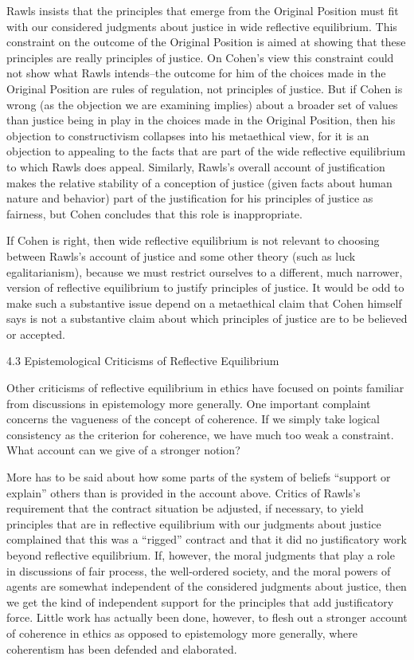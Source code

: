 \documentclass[]{article}
\begin{document}
Rawls insists that the principles that emerge from the Original Position
must fit with our considered judgments about justice in wide reflective
equilibrium. This constraint on the outcome of the Original Position is
aimed at showing that these principles are really principles of justice.
On Cohen's view this constraint could not show what Rawls intends--the
outcome for him of the choices made in the Original Position are rules
of regulation, not principles of justice. But if Cohen is wrong (as the
objection we are examining implies) about a broader set of values than
justice being in play in the choices made in the Original Position, then
his objection to constructivism collapses into his metaethical view, for
it is an objection to appealing to the facts that are part of the wide
reflective equilibrium to which Rawls does appeal. Similarly, Rawls's
overall account of justification makes the relative stability of a
conception of justice (given facts about human nature and behavior) part
of the justification for his principles of justice as fairness, but
Cohen concludes that this role is inappropriate.

If Cohen is right, then wide reflective equilibrium is not relevant to
choosing between Rawls's account of justice and some other theory (such
as luck egalitarianism), because we must restrict ourselves to a
different, much narrower, version of reflective equilibrium to justify
principles of justice. It would be odd to make such a substantive issue
depend on a metaethical claim that Cohen himself says is not a
substantive claim about which principles of justice are to be believed
or accepted.

\protect\hypertarget{EpiCriRefEqu}{}{4.3 Epistemological Criticisms of
Reflective Equilibrium}

Other criticisms of reflective equilibrium in ethics have focused on
points familiar from discussions in epistemology more generally. One
important complaint concerns the vagueness of the concept of coherence.
If we simply take logical consistency as the criterion for coherence, we
have much too weak a constraint. What account can we give of a stronger
notion?

More has to be said about how some parts of the system of beliefs
``support or explain'' others than is provided in the account above.
Critics of Rawls's requirement that the contract situation be adjusted,
if necessary, to yield principles that are in reflective equilibrium
with our judgments about justice complained that this was a ``rigged''
contract and that it did no justificatory work beyond reflective
equilibrium. If, however, the moral judgments that play a role in
discussions of fair process, the well-ordered society, and the moral
powers of agents are somewhat independent of the considered judgments
about justice, then we get the kind of independent support for the
principles that add justificatory force. Little work has actually been
done, however, to flesh out a stronger account of coherence in ethics as
opposed to epistemology more generally, where coherentism has been
defended and elaborated.
\end{document}
